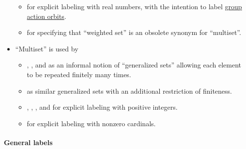 \begin{remark}
\begin{itemize}
\begin{itemize}
      \item {} for explicit labeling with real numbers, with the intention to label \hyperref[def:group_action_orbit]{group action orbits}.

      \item {} for specifying that \enquote{weighted set} is an obsolete synonym for \enquote{multiset}.
    \end{itemize}

    \item \enquote{Multiset} is used by
    \begin{itemize}
      \item {}, ,  and  as an informal notion of \enquote{generalized sets} allowing each element to be repeated finitely many times.

      \item {} as similar generalized sets with an additional restriction of finiteness.

      \item {}, , ,  and  for explicit labeling with positive integers.

      \item {} for explicit labeling with nonzero cardinals.
    \end{itemize}
  \end{itemize}
\end{remark}

\paragraph{General labels}

